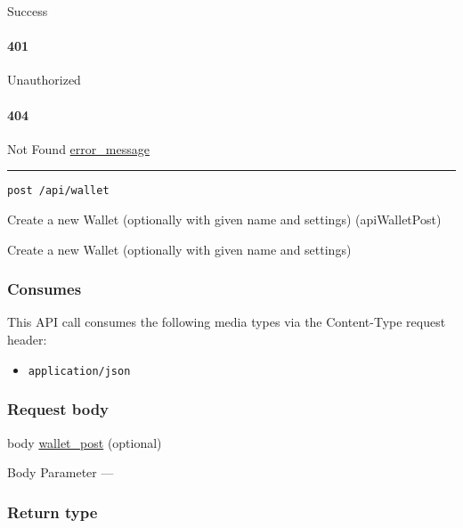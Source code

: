 Success

\hypertarget{section-610}{%
\paragraph{401}\label{section-610}}

Unauthorized \protect\hyperlink{}{}

\hypertarget{section-611}{%
\paragraph{404}\label{section-611}}

Not Found \protect\hyperlink{error_message}{error\_message}

\begin{center}\rule{0.5\linewidth}{\linethickness}\end{center}

\protect\hypertarget{apiWalletPost}{}{}

\begin{verbatim}
post /api/wallet
\end{verbatim}

Create a new Wallet (optionally with given name and settings)
({apiWalletPost})

Create a new Wallet (optionally with given name and settings)

\hypertarget{consumes-59}{%
\subsubsection{Consumes}\label{consumes-59}}

This API call consumes the following media types via the {Content-Type}
request header:

\begin{itemize}
\tightlist
\item
  \texttt{application/json}
\end{itemize}

\hypertarget{request-body-59}{%
\subsubsection{Request body}\label{request-body-59}}

body \protect\hyperlink{wallet_post}{wallet\_post} (optional)

{Body Parameter} ---

\hypertarget{return-type-145}{%
\subsubsection{Return type}\label{return-type-145}}

